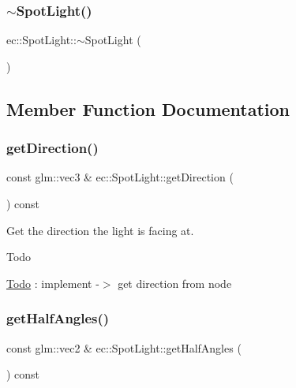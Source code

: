 \mbox{\label{classec_1_1_spot_light_adc9a1ffa198252e085c6862c063c8263}} 
\subsubsection{\texorpdfstring{$\sim$\+Spot\+Light()}{~SpotLight()}}
{\footnotesize\ttfamily ec\+::\+Spot\+Light\+::$\sim$\+Spot\+Light (\begin{DoxyParamCaption}{ }\end{DoxyParamCaption})\hspace{0.3cm}{\ttfamily [default]}}



\subsection{Member Function Documentation}
\mbox{\label{classec_1_1_spot_light_a373e8b5dc16c19fb7a0ba8ea5333f551}} 
\subsubsection{\texorpdfstring{get\+Direction()}{getDirection()}}
{\footnotesize\ttfamily const glm\+::vec3 \& ec\+::\+Spot\+Light\+::get\+Direction (\begin{DoxyParamCaption}{ }\end{DoxyParamCaption}) const}

Get the direction the light is facing at. \begin{DoxyRefDesc}{Todo}
\item[\mbox{\hyperlink{todo__todo000009}{Todo}}]\+: implement -\/$>$ get direction from node \end{DoxyRefDesc}
\mbox{\label{classec_1_1_spot_light_a1f53e54ee38973a55438c0321b78b439}} 
\subsubsection{\texorpdfstring{get\+Half\+Angles()}{getHalfAngles()}}
{\footnotesize\ttfamily const glm\+::vec2 \& ec\+::\+Spot\+Light\+::get\+Half\+Angles (\begin{DoxyParamCaption}{ }\end{DoxyParamCaption}) const}


